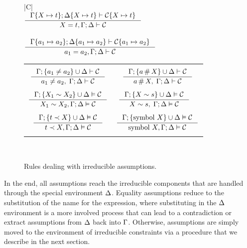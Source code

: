 \documentclass[english, mgr]{iithesis}
\newcommand{\solverRule}{\vdash}
\newcommand{\scbrk}[2]{\myatop{\textsc{#1}}{\textsc{#2}}}
\begin{document}
\begin{figure}[hbtp]
  \centering
  \begin{tabularx}{\textwidth}{|C|}
      \hline \\ $
      \inference{
        \cEnv\subst{\termv}{\term} ; \icEnv\subst{\termv}{\term}
          \solverRule \sconstr\subst{\termv}{\term}
      }{
        \termv = \term, \cEnv ; \icEnv \solverRule \sconstr
      }$ \\ \\
      $
      \inference{
        \cEnv \subst{\atomv_1}{\atomv_2}; \icEnv\subst{\atomv_1}{\atomv_2}
          \solverRule \sconstr\subst{\atomv_1}{\atomv_2}
      }{
        \atomv_1 \ceq \atomv_2, \cEnv ; \icEnv \solverRule \sconstr
      }$ \\
    \begin{tabular}{cc}
    & \\ $
    \inference{
      \cEnv ; \{\atomv_1 \cneq \atomv_2\} \cup \icEnv \solverRule \sconstr
    }{
      \atomv_1 \cneq \atomv_2, \; \cEnv ; \icEnv \solverRule \sconstr
    }
    $ & $
    \inference{
      \cEnv ; \{\atomv \cfresh \termv\} \cup \icEnv \solverRule \sconstr
    }{
      \atomv \cfresh \termv, \; \cEnv ; \icEnv \solverRule \sconstr
    }
    $ \\ & \\ $
    \inference{
      \cEnv ; \{\termv_1 \csheq \termv_2\} \cup \icEnv \vDash \sconstr
    }{
      \termv_1 \csheq \termv_2, \cEnv ; \icEnv \vDash \sconstr
    }
    $ & $
    \inference{
      \cEnv ; \{\termv \csheq \shape\} \cup \icEnv \vDash \sconstr
    }{
      \termv \csheq \shape,\; \cEnv ; \icEnv \vDash \sconstr
    }
    \quad
    $ \\ & \\ $
    \inference{
      \cEnv ; \{\term \cshlt \termv\} \cup \icEnv \vDash \sconstr
    }{
      \term \cshlt \termv, \cEnv ; \icEnv \vDash \sconstr
    }
    $ & $
    \inference{
      \cEnv ; \{\csymb \termv\} \cup \icEnv \vDash \sconstr
    }{
      \csymb \termv, \cEnv ; \icEnv \vDash \sconstr
    }
    $ \\ & \\
    \end{tabular}
    \\ \hline
    \end{tabularx}
  \caption{Rules dealing with irreducible assumptions.}
  \label{fig:assumption-equality-rules}
\end{figure}
In the end, all assumptions reach the irreducible components that are handled through
the special environment $\Delta$.
Equality assumptions reduce to the substitution of the name for the expression, where
substituting in the $\Delta$ environment is a more involved process
that can lead to a contradiction or extract assumptions from $\Delta$ back into $\Gamma$.
Otherwise, assumptions are simply moved to the environment of irreducible
constraints via a procedure that we describe in the next section.
\end{document}
